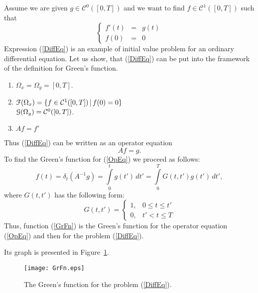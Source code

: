 \documentclass[12pt]{article}
\begin{document}
Assume we are given $g\in\mathcal{C}^0([0,T])$ and we want to find $f\in\mathcal{C}^1([0,T])$ such that
\begin{equation}\label{DiffEq}
    \left\{
    \begin{array}{rcl}
        f'(t) & = & g(t) \\
        f(0)  & = & 0
    \end{array}
    \right.
\end{equation}
Expression (\ref{DiffEq}) is an example of initial value problem for an ordinary differential equation. Let us
show, that (\ref{DiffEq}) can be put into the framework of the definition for Green's function.
\begin{enumerate}
\item $\Omega_x=\Omega_y=[0,T]$.

\item $\EuScript{F}(\Omega_x)=\{ f\in\mathcal{C}^1([0,T])\,|\,f(0)=0 \}$\\
      $\EuScript{G}(\Omega_y)=\mathcal{C}^0([0,T])$.

\item $Af=f'$

\end{enumerate}
Thus (\ref{DiffEq}) can be written as an operator equation
\begin{equation}\label{OpEq}
    Af=g.
\end{equation}
To find the Green's function for (\ref{OpEq}) we proceed as follows:
$$
    f(t)=\delta_t(A^{-1}g)=\int\limits_0^t g(t')\,dt'=\int\limits_0^T G(t,t')g(t')\,dt',
$$
where $G(t,t')$ has the following form:
\begin{equation}\label{GrFn}
    G(t,t')=\left\{
                \begin{array}{rl}
                    1, & 0\leq t \leq t'\\
                    0, & t'<   t \leq T
                \end{array}
            \right.
\end{equation}
Thus, function (\ref{GrFn}) is the Green's function for the operator equation (\ref{OpEq}) and
then for the problem (\ref{DiffEq}). 

Its graph is presented in Figure~\ref{GrFnPic}.

\begin{figure}[h]
\begin{center}
    \texttt{[image: GrFn.eps]}
\end{center}
\caption{The Green's function for the problem (\ref{DiffEq}).}
\label{GrFnPic}
\end{figure}
\end{document}
